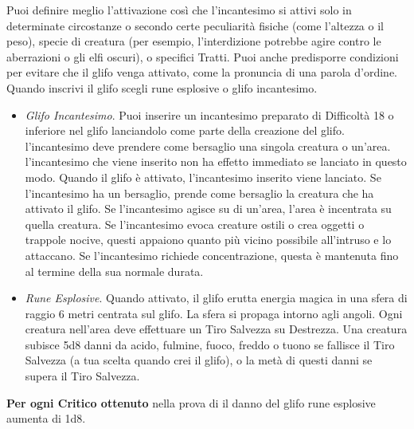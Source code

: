 \begin{multicols}{2}
Puoi definire meglio l’attivazione così che l'incantesimo si attivi solo in determinate circostanze o secondo certe peculiarità fisiche (come l’altezza o il peso), specie di creatura (per esempio, l’interdizione potrebbe agire contro le aberrazioni o gli elfi oscuri), o specifici Tratti. Puoi anche predisporre condizioni per evitare che il glifo  venga attivato, come la pronuncia di una parola d’ordine.\\
Quando inscrivi il glifo scegli rune esplosive o glifo incantesimo.
\medskip
\begin{itemize}
\item
\textit{Glifo Incantesimo}. Puoi inserire un incantesimo preparato di Difficoltà 18 o inferiore nel glifo lanciandolo come parte della creazione del glifo. l'incantesimo deve prendere come bersaglio una singola creatura o un'area. l'incantesimo che viene inserito non ha effetto immediato se lanciato in questo modo. Quando il glifo è attivato, l'incantesimo inserito viene lanciato. Se l'incantesimo ha un bersaglio, prende come bersaglio la creatura che ha attivato il glifo. Se l'incantesimo agisce su di un'area, l’area è incentrata su quella creatura. Se l'incantesimo evoca creature ostili o crea oggetti o trappole nocive, questi appaiono quanto più vicino possibile all'intruso e lo attaccano. Se l'incantesimo richiede concentrazione, questa è mantenuta fino al termine della sua normale durata.
\item
\textit{Rune Esplosive}. Quando attivato, il glifo erutta energia magica in una sfera di raggio 6 metri centrata sul glifo. La sfera si propaga intorno agli angoli. Ogni creatura nell'area deve effettuare un Tiro Salvezza su Destrezza. Una creatura subisce 5d8 danni da acido, fulmine, fuoco, freddo o tuono se fallisce il Tiro Salvezza (a tua scelta quando crei il glifo), o la metà di questi danni se supera il Tiro Salvezza.
\end{itemize}
\medskip
\textbf{Per ogni Critico ottenuto} nella prova di il danno del glifo rune esplosive aumenta di 1d8.


\end{multicols}
